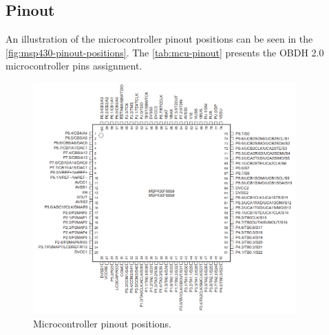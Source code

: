 \subsection{Pinout}

An illustration of the microcontroller pinout positions can be seen in the \autoref{fig:msp430-pinout-positions}. The \autoref{tab:mcu-pinout} presents the OBDH 2.0 microcontroller pins assignment.

\begin{figure}[!ht]
    \begin{center}
        \includegraphics[width=0.9\textwidth]{figures/msp430-pinout.png}
        \caption{Microcontroller pinout positions.}
        \label{fig:msp430-pinout-positions}
    \end{center}
\end{figure}

